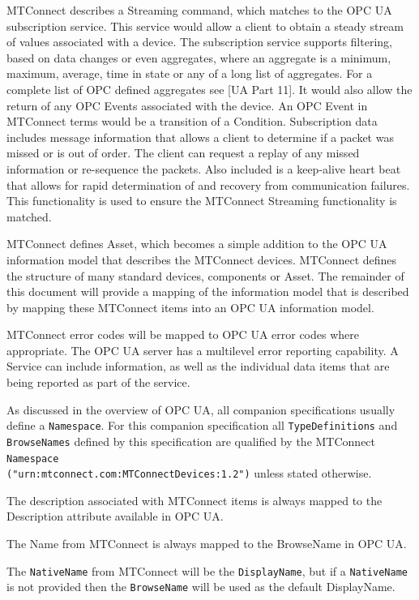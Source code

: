 MTConnect describes a Streaming command, which matches to the OPC UA subscription service. This service would allow a client to obtain a steady stream of values associated with a device. The subscription service supports filtering, based on data changes or even aggregates, where an aggregate is a minimum, maximum, average, time in state or any of a long list of aggregates. For a complete list of OPC defined aggregates see [UA Part 11]. It would also allow the return of any OPC Events associated with the device. An OPC Event in MTConnect terms would be a transition of a Condition. Subscription data includes message information that allows a client to determine if a packet was missed or is out of order. The client can request a replay of any missed information or re-sequence the packets. Also included is a keep-alive heart beat that allows for rapid determination of and recovery from communication failures. This functionality is used to ensure the MTConnect Streaming functionality is matched.

MTConnect defines Asset, which becomes a simple addition to the OPC UA information model that describes the MTConnect devices. MTConnect defines the structure of many standard devices, components or Asset. The remainder of this document will provide a mapping of the information model that is described by mapping these MTConnect items into an OPC UA information model.

MTConnect error codes will be mapped to OPC UA error codes where appropriate. The OPC UA server has a multilevel error reporting capability. A Service can include  	 information, as well as the individual data items that are being reported as part of the service.

As discussed in the overview of OPC UA, all companion specifications usually define a \texttt{Namespace}. For this companion specification all \texttt{Type\-Definitions} and \texttt{Browse\-Names} defined by this specification are qualified by the MTConnect \texttt{Namespace} \\
\texttt{("urn:mtconnect.com:MTConnectDevices:1.2")} unless stated otherwise.

The description associated with MTConnect items is always mapped to the Description attribute available in OPC UA.

The Name from MTConnect is always mapped to the BrowseName in OPC UA.

The \texttt{NativeName} from MTConnect will be the \texttt{DisplayName}, but if a \texttt{NativeName} is not provided then the \texttt{BrowseName} will be used as the default DisplayName.


